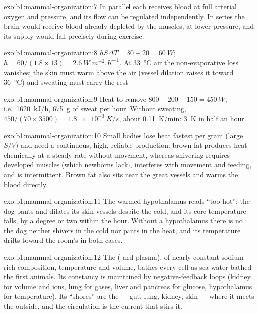 \begin{solution}{exo:b1:mammal-organization:7}
In parallel each  receives blood at full arterial oxygen and
pressure, and its flow can be regulated independently. In series the
brain would receive blood already depleted by the muscles, at lower
pressure, and its supply would fall precisely during exercise.
\end{solution}

\begin{solution}{exo:b1:mammal-organization:8}
$hS\Delta T = 80 - 20 = \qty{60}{W}$; $h = 60/(1.8\times 13) =
\qty{2.6}{W.m^{-2}.K^{-1}}$. At \qty{33}{\celsius} air the
non-evaporative loss vanishes; the skin must warm above the air (vessel
dilation raises it toward \qty{36}{\celsius}) and sweating must carry the
rest.
\end{solution}

\begin{solution}{exo:b1:mammal-organization:9}
Heat to remove $800 - 200 - 150 = \qty{450}{W}$, i.e.\ \qty{1620}{kJ/h},
\qty{675}{g} of sweat per hour. Without sweating, $450/(70\times 3500) =
\qty{1.8e-3}{K/s}$, about \qty{0.11}{K/min}: \qty{3}{K} in half an hour.
\end{solution}

\begin{solution}{exo:b1:mammal-organization:10}
Small bodies lose heat fastest per gram (large $S/V$) and need a
continuous, high, reliable production: brown fat produces heat
chemically at a steady rate without movement, whereas shivering
requires developed muscles (which newborns lack), interferes with
movement and feeding, and is intermittent. Brown fat also sits near the
great vessels and warms the blood directly.
\end{solution}

\begin{solution}{exo:b1:mammal-organization:11}
The warmed hypothalamus reads ``too hot'': the dog pants and dilates its
skin vessels despite the cold, and its core temperature falls, by a
degree or two within the hour. Without a hypothalamus there is no : the dog neither shivers in the cold nor pants in the heat, and
its temperature drifts toward the room's in both cases.
\end{solution}

\begin{solution}{exo:b1:mammal-organization:12}
The  ( and plasma), of nearly
constant sodium-rich composition, temperature and volume, bathes every
cell as sea water bathed the first animals. Its constancy is maintained
by negative-feedback loops (kidney for volume and ions, lung for gases,
liver and pancreas for glucose, hypothalamus for temperature). Its
``shores'' are the  --- gut, lung, kidney, skin ---
where it meets the outside, and the circulation is the current that
stirs it.
\end{solution}

